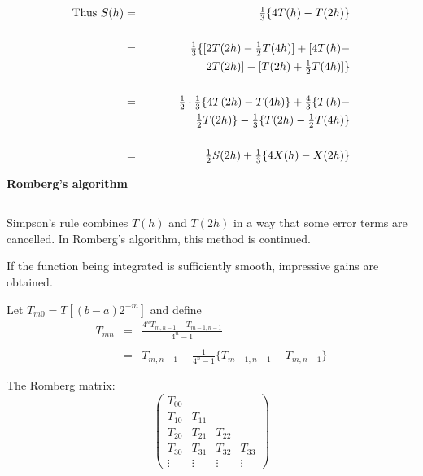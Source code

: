 \documentclass[12pt,letterpaper]{article}
\newcommand{\HRule}{\rule{\linewidth}{4pt}}
\newcommand{\hsphalf}{\hspace*{0.5cm}}
\newcommand{\hspone}{\hspace*{1cm}}
\newcommand{\vsphalf}{\vspace*{0.5cm}}
\newcommand{\vspone}{\vspace*{1cm}}
\begin{document}
\begin{eqnarray*}
\text{Thus } S(h) & = & {\textstyle \frac{1}{3}} \{ 4 T(h) - T(2h) \}
\\ \\
& = & {\textstyle \frac{1}{3}} \{ [2 T(2h) - {\textstyle \frac{1}{2}}
            T(4h)] + [4 T(h) - \\
            & & \hspone \hsphalf 2 T(2h)] - [T(2h) + {\textstyle \frac{1}{2}}
T(4h)] \} \\ \\
& = & {\textstyle \frac{1}{2}} \cdot {\textstyle \frac{1}{3}} \{ 4
            T(2h) - T(4h) \} + {\textstyle \frac{4}{3}} \{T(h) - \\
            & & \hspone \hsphalf {\textstyle \frac{1}{2}} T(2h) \} -
            {\textstyle \frac{1}{3}} \{ T(2h) - {\textstyle \frac{1}{2}}
            T(4h) \} \\ \\
& = & {\textstyle \frac{1}{2}}S(2h) + {\textstyle \frac{1}{3}} \{
            4 X(h) - X(2h) \}
\end{eqnarray*}


\newpage

\fontsize{30}{30} \selectfont

\centerline{\textbf{Romberg's algorithm}}

\HRule

\vsphalf

\fontsize{20}{25} \selectfont

Simpson's rule combines $T(h)$ and $T(2h)$ in a way that some error
terms are cancelled.  In Romberg's algorithm, this method is
continued.

\bigskip

If the function being integrated is sufficiently smooth, impressive
gains are obtained.

\vspone

Let $T_{m0} = T[(b-a)2^{-m}]$ and define
\begin{eqnarray*}
T_{mn} & = & \frac{4^n T_{m,n-1} - T_{m-1,n-1}}{4^n-1}\\ \\
       & = & T_{m,n-1} - {\textstyle \frac{1}{4^n-1}} \{ T_{m-1,n-1} -
       T_{m,n-1} \}
\end{eqnarray*}

\vspone

The Romberg matrix:
$$ \begin{pmatrix} T_{00} \\
T_{10} & T_{11} \\
T_{20} & T_{21} & T_{22} \\
T_{30} & T_{31} & T_{32} & T_{33} \\
\vdots & \vdots & \vdots & \vdots \end{pmatrix} $$
\end{document}
